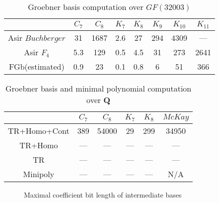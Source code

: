 \documentclass[runningheads]{cl2emult}
\begin{document}
\begin{table}[hbtp]
\begin{center}
\begin{tabular}{|c||c|c|c|c|c|c|c|} \hline
		& $C_7$ & $C_8$ & $K_7$ & $K_8$ & $K_9$ & $K_{10}$ & $K_{11}$ \\ \hline
Asir $Buchberger$	& 31 & 1687  & 2.6  & 27 & 294  & 4309 & --- \\ \hline
Asir $F_4$	& 5.3 & 129 & 0.5  & 4.5 & 31  & 273 & 2641 \\ \hline
FGb(estimated)	& 0.9 & 23 & 0.1 & 0.8 & 6 & 51 & 366 \\ \hline
\end{tabular}
\end{center}
\caption{Groebner basis computation over $GF(32003)$}
\label{tab:gbmod}
\end{table}
\begin{table}[hbtp]
\begin{center}
\begin{tabular}{|c||c|c|c|c|c|} \hline
		& $C_7$ & $C_8$ & $K_7$ & $K_8$ & $McKay$ \\ \hline
TR+Homo+Cont & 389 & 54000 & 29 & 299 & 34950 \\ \hline
TR+Homo & --- & --- & --- & --- & --- \\ \hline
TR & --- & --- & --- & --- & --- \\ \hline \hline
Minipoly & --- & --- & --- & --- & N/A \\ \hline
\end{tabular}
\end{center}
\caption{Groebner basis and minimal polynomial computation over {\bf Q}}
\label{tab:gbq}
\end{table}

\begin{figure}[hbtp]
\begin{center}
\epsfxsize=12cm
\end{center}
\caption{Maximal coefficient bit length of intermediate bases}
\label{tab:f4vsbuch}
\end{figure}
\end{document}

